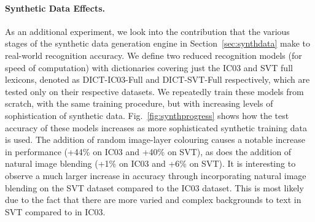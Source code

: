 \documentclass[twocolumn]{svjour3}          \smartqed  \usepackage{epsfig}
\begin{document}
\paragraph{Synthetic Data Effects.}
As an additional experiment, we look into the contribution that the various stages of the synthetic data generation engine in Section~\ref{sec:synthdata} make to real-world recognition accuracy. We define two reduced recognition models (for speed of computation) with dictionaries covering just the IC03 and SVT full lexicons, denoted as DICT-IC03-Full and DICT-SVT-Full respectively, which are tested only on their respective datasets. We repeatedly train these models from scratch, with the same training procedure, but with increasing levels of sophistication of synthetic data. Fig.~\ref{fig:synthprogress} shows how the test accuracy of these models increases as more sophisticated synthetic training data is used. The addition of random image-layer colouring causes a notable increase in performance (+44\% on IC03 and +40\% on SVT), as does the addition of natural image blending (+1\% on IC03 and +6\% on SVT). It is interesting to observe a much larger increase in accuracy through incorporating natural image blending on the SVT dataset compared to the IC03 dataset. This is most likely due to the fact that there are more varied and complex backgrounds to text in SVT compared to in IC03.
\end{document}
